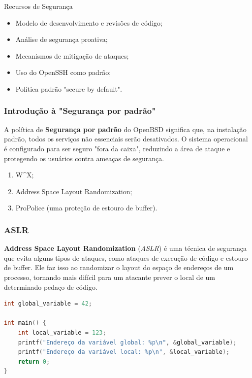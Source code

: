 \documentclass[9pt,xcolor=table]{beamer}
\begin{document}
\begin{frame}{Recursos de Segurança}
  \begin{itemize}
    \item Modelo de desenvolvimento e revisões de código;
    \item Análise de segurança proativa;
    \item Mecanismos de mitigação de ataques;
    \item Uso do OpenSSH como padrão;
    \item Política padrão "secure by default".
  \end{itemize}
\end{frame}
\begin{frame}
\frametitle{Introdução à "Segurança por padrão"}
\justifying
A política de \textbf{Segurança por padrão} do OpenBSD significa que, na instalação padrão, todos os serviços não essenciais serão desativados. O sistema operacional é configurado para ser seguro "fora da caixa", reduzindo a área de ataque e protegendo os usuários contra ameaças de segurança.
\vspace{0.5cm}
\begin{enumerate}
 \item W\^{}X;
 \item Address Space Layout Randomization;
 \item ProPolice (uma proteção de estouro de buffer).
\end{enumerate}
\end{frame}
\begin{frame}[fragile]
\frametitle{ASLR}
\justifying
\textbf{Address Space Layout Randomization} (\textit{ASLR}) é uma técnica de segurança que evita alguns tipos de ataques, como ataques de execução de código e estouro de buffer. Ele faz isso ao randomizar o layout do espaço de endereços de um processo, tornando mais difícil para um atacante prever o local de um determinado pedaço de código.
\vspace{0.5cm}
\begin{lstlisting}[language=C]
int global_variable = 42;

int main() {
    int local_variable = 123;
    printf("Endereço da variável global: %p\n", &global_variable);
    printf("Endereço da variável local: %p\n", &local_variable);
    return 0;
}
\end{lstlisting}
\end{frame}
\end{document}
